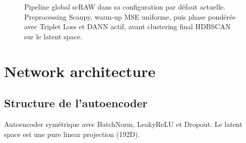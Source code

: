 \documentclass[11pt,a4paper]{article}
\begin{document}
\begin{figure}[H]
{%
}
\caption{Pipeline global scRAW dans sa configuration par d\'efaut actuelle. Preprocessing Scanpy, warm-up MSE uniforme, puis phase pond\'er\'ee avec Triplet Loss et DANN actif, avant clustering final HDBSCAN sur le latent space.}
\label{fig:pipeline_global}
\end{figure}


\section{Network architecture}
\label{sec:architecture}

\subsection{Structure de l'autoencoder}

Autoencoder sym\'etrique avec BatchNorm, LeakyReLU et Dropout. Le latent space est une pure linear projection (192D).
\end{document}
